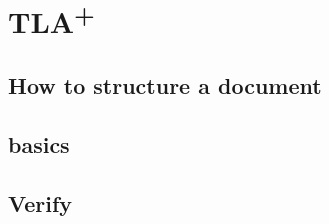 
\chapter{TLA\textsuperscript{+}} %

\label{TLA+} %


\section{How to structure a document}

\section{basics}

\section{Verify}